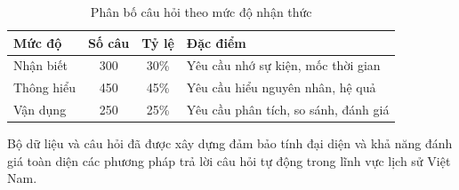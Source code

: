 \begin{table}[H]
\centering
\caption{Phân bố câu hỏi theo mức độ nhận thức}
\label{tab:question-difficulty}
\begin{tabular}{|l|c|c|l|}
\hline
\textbf{Mức độ} & \textbf{Số câu} & \textbf{Tỷ lệ} & \textbf{Đặc điểm} \\
\hline
Nhận biết & 300 & 30\% & Yêu cầu nhớ sự kiện, mốc thời gian \\
Thông hiểu & 450 & 45\% & Yêu cầu hiểu nguyên nhân, hệ quả \\
Vận dụng & 250 & 25\% & Yêu cầu phân tích, so sánh, đánh giá \\
\hline
\end{tabular}
\end{table}

Bộ dữ liệu và câu hỏi đã được xây dựng đảm bảo tính đại diện và khả năng đánh giá toàn diện các phương pháp trả lời câu hỏi tự động trong lĩnh vực lịch sử Việt Nam.
